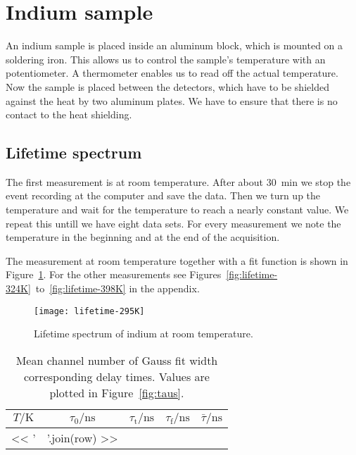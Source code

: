 \documentclass[11pt, english, fleqn, DIV=15, headinclude, BCOR=2cm]{scrreprt}
\begin{document}
\section{Indium sample}

An indium sample is placed inside an aluminum block, which is mounted on a
soldering iron. This allows us to control the sample's temperature with an
potentiometer. A thermometer enables us to read off the actual temperature. Now
the sample is placed between the detectors, which have to be shielded against
the heat by two aluminum plates. We have to ensure that there is no contact to
the heat shielding. 

\subsection{Lifetime spectrum}

The first measurement is at room temperature. After about \SI{30}{\minute} we
stop the event recording at the computer and save the data. Then we turn up the
temperature and wait for the temperature to reach a nearly
constant value. We repeat this untill we have eight data sets. For every
measurement we note the temperature in the beginning and at the end of the
acquisition.

The measurement at room temperature together with a fit function is shown in
Figure~\ref{fig:lifetime-295K}. For the other measurements see
Figures~\ref{fig:lifetime-324K}~to~\ref{fig:lifetime-398K} in the appendix.

\begin{figure}
    \centering
    \texttt{[image: lifetime-295K]}
    \caption{%
        Lifetime spectrum of indium at room temperature.
    }
    \label{fig:lifetime-295K}
\end{figure}

\begin{table}
    \centering
    \begin{tabular}{SSSSS}
        \toprule
        {$T/\si{\kelvin}$}
        & {$\tau_0 / \si{\nano\second}$}
        & {$\tau_\mathrm t / \si{\nano\second}$}
        & {$\tau_\mathrm f / \si{\nano\second}$}
        & {$\bar \tau / \si{\nano\second}$}
        \\
        \midrule
        << ' & '.join(row) >> \\
        \bottomrule
    \end{tabular}
    \caption{%
        Mean channel number of Gauss fit width corresponding delay
        times. Values are plotted in Figure~\ref{fig:taus}.
    }
    \label{tab:taus}
\end{table}
\end{document}
